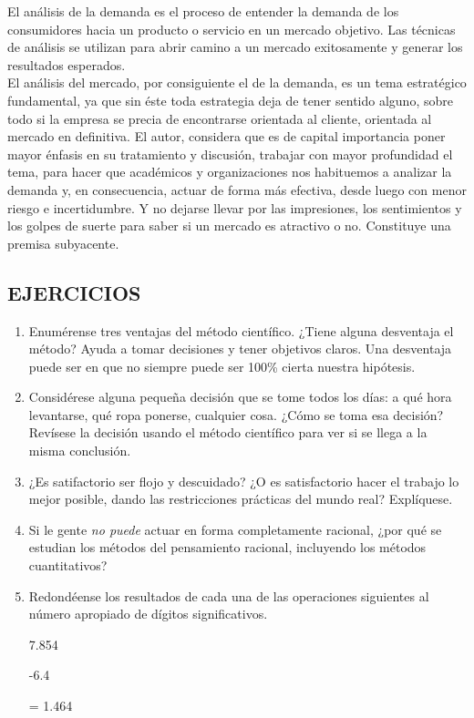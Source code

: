 \documentclass[letterpaper,12pt]{article}
\begin{document}
\begin{sloppypar}
El análisis de la demanda es el proceso de entender la demanda de los consumidores hacia un producto o servicio en un mercado objetivo. Las técnicas de análisis se utilizan para abrir camino a un mercado exitosamente y generar los resultados esperados.
\vspace{0.3cm}\\
El análisis del mercado, por consiguiente el de la demanda, es un tema estratégico fundamental, ya que sin éste toda estrategia deja de tener sentido alguno, sobre todo si la empresa se precia de encontrarse orientada al cliente, orientada al mercado en definitiva. El autor, considera que es
de capital importancia poner mayor énfasis en su tratamiento y discusión, trabajar con mayor profundidad el tema, para hacer que académicos y
organizaciones nos habituemos a analizar la demanda y, en consecuencia, actuar de forma más efectiva, desde luego con menor riesgo e incertidumbre. Y no dejarse llevar por las impresiones, los sentimientos y los golpes de suerte para saber si un mercado es atractivo o no. Constituye una premisa subyacente.

\newpage
\subsection*{EJERCICIOS}
\begin{enumerate}
    \item Enumérense tres ventajas del método científico. ¿Tiene alguna desventaja el método? Ayuda a tomar decisiones y tener objetivos claros. Una desventaja puede ser en que no siempre puede ser 100\% cierta nuestra hipótesis. 
    \item Considérese alguna pequeña decisión que se tome todos los días: a qué hora levantarse, qué ropa ponerse, cualquier cosa. ¿Cómo se toma esa decisión? Revísese la decisión usando el método científico para ver si se llega a la misma conclusión.
    
    \item ¿Es satifactorio ser flojo y descuidado? ¿O es satisfactorio hacer el trabajo lo mejor posible, dando las restricciones prácticas del mundo real? Explíquese.
    \item Si le gente \textit{no puede} actuar en forma completamente racional, ¿por qué se estudian los métodos del pensamiento racional, incluyendo los métodos cuantitativos?
    \item Redondéense los resultados de cada una de las operaciones siguientes al número apropiado de dígitos significativos.
    \begin{center}
        7.854

        -6.4

        = 1.464
    \end{center}
\end{enumerate}


\end{sloppypar}
\end{document}
